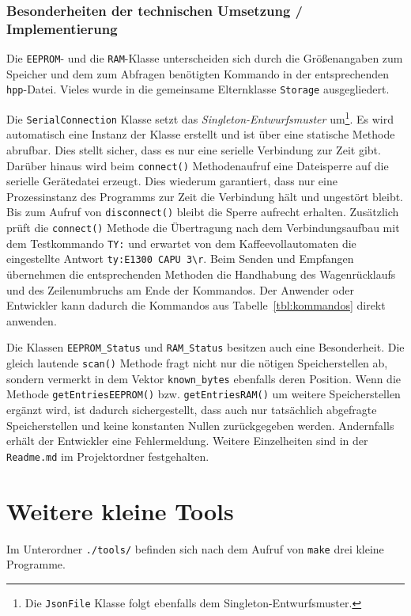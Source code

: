 \subsubsection{Besonderheiten der technischen Umsetzung / Implementierung}
Die \texttt{EEPROM}- und die \texttt{RAM}-Klasse unterscheiden sich durch die Größenangaben zum Speicher und dem zum Abfragen benötigten Kommando in der entsprechenden \texttt{hpp}-Datei.
Vieles wurde in die gemeinsame Elternklasse \texttt{Storage} ausgegliedert.

Die \texttt{SerialConnection} Klasse setzt das \textit{Singleton-Entwurfsmuster} um\footnote{Die \texttt{JsonFile} Klasse folgt ebenfalls dem Singleton-Entwurfsmuster.}.
Es wird automatisch eine Instanz der Klasse erstellt und ist über eine statische Methode abrufbar.
Dies stellt sicher, dass es nur eine serielle Verbindung zur Zeit gibt.
Darüber hinaus wird beim \texttt{connect()} Methodenaufruf eine Dateisperre auf die serielle Gerätedatei erzeugt.
Dies wiederum garantiert, dass nur eine Prozessinstanz des Programms zur Zeit die Verbindung hält und ungestört bleibt.
Bis zum Aufruf von \texttt{disconnect()} bleibt die Sperre aufrecht erhalten.
Zusätzlich prüft die \texttt{connect()} Methode die Übertragung nach dem Verbindungsaufbau mit dem Testkommando \texttt{TY:} und erwartet von dem Kaffeevollautomaten die eingestellte Antwort \texttt{ty:E1300 CAPU 3\textbackslash r}.
Beim Senden und Empfangen übernehmen die entsprechenden Methoden die Handhabung des Wagenrücklaufs und des Zeilenumbruchs am Ende der Kommandos.
Der Anwender oder Entwickler kann dadurch die Kommandos aus Tabelle~\ref{tbl:kommandos} direkt anwenden.

Die Klassen \texttt{EEPROM\_Status} und \texttt{RAM\_Status} besitzen auch eine Besonderheit.
Die gleich lautende \texttt{scan()} Methode fragt nicht nur die nötigen Speicherstellen ab, sondern vermerkt in dem Vektor \texttt{known\_bytes} ebenfalls deren Position.
Wenn die Methode \texttt{getEntriesEEPROM()} bzw. \texttt{getEntriesRAM()} um weitere Speicherstellen ergänzt wird, ist dadurch sichergestellt, dass auch nur tatsächlich abgefragte Speicherstellen und keine konstanten Nullen zurückgegeben werden.
Andernfalls erhält der Entwickler eine Fehlermeldung.
Weitere Einzelheiten sind in der \texttt{Readme.md} im Projektordner festgehalten.

\section{Weitere kleine Tools}\label{subsec:tools}
Im Unterordner \texttt{./tools/} befinden sich nach dem Aufruf von \texttt{make} drei kleine Programme.

